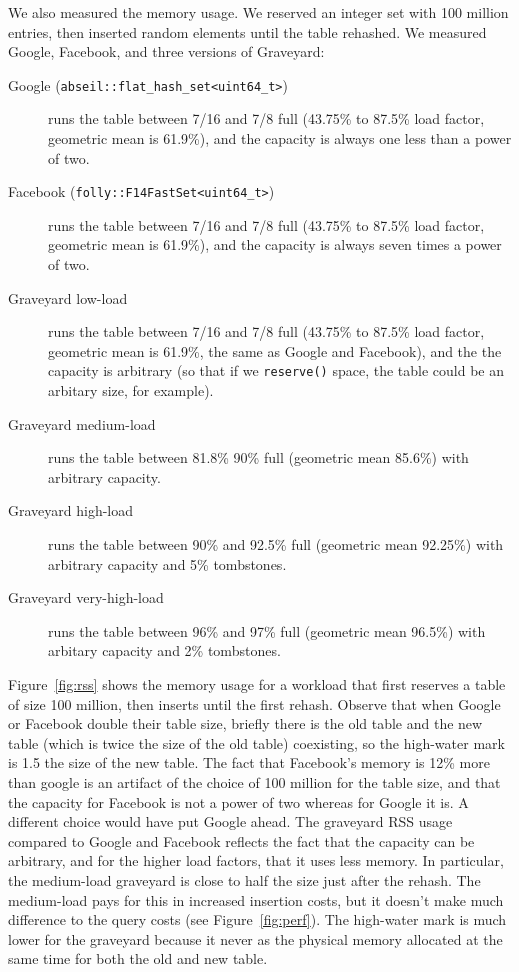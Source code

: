 \documentclass[10pt]{article}
\theoremstyle{remark}
\theoremstyle{remark}
\newcommand{\figref}[1]{Figure~\ref{fig:#1}}
\begin{document}
We also measured the memory usage.  We reserved an integer set with
100 million entries, then inserted random elements until the table
rehashed.  We measured Google, Facebook, and three versions of
Graveyard:
\begin{description}
  \item[Google (\texttt{abseil::flat\_hash\_set<uint64\_t>})] runs the
    table between 7/16 and 7/8 full (43.75\% to 87.5\% load factor,
    geometric mean is 61.9\%), and the capacity is always one less
    than a power of two.
  \item[Facebook (\texttt{folly::F14FastSet<uint64\_t>})] runs the table
    between 7/16 and 7/8 full (43.75\% to 87.5\% load factor,
    geometric mean is 61.9\%), and the capacity is always seven times
    a power of two.
  \item[Graveyard low-load] runs the table between 7/16 and 7/8 full
    (43.75\% to 87.5\% load factor, geometric mean is 61.9\%, the same
    as Google and Facebook), and the the capacity is arbitrary (so
    that if we \verb+reserve()+ space, the table could be an arbitary
    size, for example).
  \item[Graveyard medium-load]  runs the table between 81.8\% 90\% full (geometric mean 85.6\%) with arbitrary capacity.
  \item[Graveyard high-load] runs the table between 90\% and 92.5\% full (geometric mean 92.25\%) with arbitrary capacity and 5\% tombstones.
  \item[Graveyard very-high-load] runs the table between 96\% and 97\% full (geometric mean 96.5\%) with arbitary capacity and 2\% tombstones.
\end{description}

\figref{rss} shows the memory usage for a workload that first reserves
a table of size 100 million, then inserts until the first rehash.
Observe that when Google or Facebook double their table size, briefly
there is the old table and the new table (which is twice the size of
the old table) coexisting, so the high-water mark is 1.5 the size of
the new table.  The fact that Facebook's memory is 12\% more than
google is an artifact of the choice of 100 million for the table size,
and that the capacity for Facebook is not a power of two whereas for
Google it is.  A different choice would have put Google ahead.  The
graveyard RSS usage compared to Google and Facebook reflects the fact
that the capacity can be arbitrary, and for the higher load factors,
that it uses less memory.  In particular, the medium-load graveyard is
close to half the size just after the rehash.  The medium-load pays
for this in increased insertion costs, but it doesn't make much
difference to the query costs (see \figref{perf}).  The high-water
mark is much lower for the graveyard because it never as the physical
memory allocated at the same time for both the old and new table.
\end{document}
